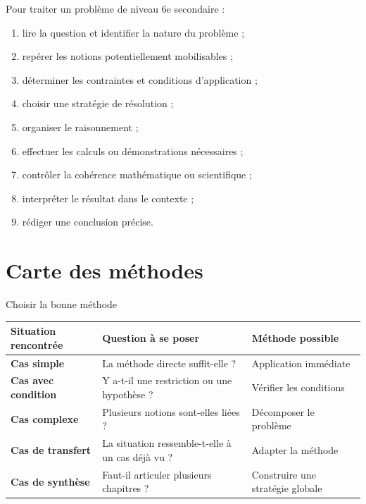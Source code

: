 \documentclass[11pt,a4paper]{article}
\begin{document}
\begin{cadremethode}
Pour traiter un problème de niveau 6e secondaire :

\begin{enumerate}
    \item lire la question et identifier la nature du problème ;
    \item repérer les notions potentiellement mobilisables ;
    \item déterminer les contraintes et conditions d’application ;
    \item choisir une stratégie de résolution ;
    \item organiser le raisonnement ;
    \item effectuer les calculs ou démonstrations nécessaires ;
    \item contrôler la cohérence mathématique ou scientifique ;
    \item interpréter le résultat dans le contexte ;
    \item rédiger une conclusion précise.
\end{enumerate}
\end{cadremethode}

\section{Carte des méthodes}

\begin{cadregris}{Choisir la bonne méthode}
\renewcommand{\arraystretch}{1.35}
\begin{tabularx}{\textwidth}{>{\bfseries}p{3.5cm}X X}
\toprule
Situation rencontrée & Question à se poser & Méthode possible \\
\midrule
Cas simple & La méthode directe suffit-elle ? & Application immédiate \\
Cas avec condition & Y a-t-il une restriction ou une hypothèse ? & Vérifier les conditions \\
Cas complexe & Plusieurs notions sont-elles liées ? & Décomposer le problème \\
Cas de transfert & La situation ressemble-t-elle à un cas déjà vu ? & Adapter la méthode \\
Cas de synthèse & Faut-il articuler plusieurs chapitres ? & Construire une stratégie globale \\
\bottomrule
\end{tabularx}
\end{cadregris}
\end{document}
